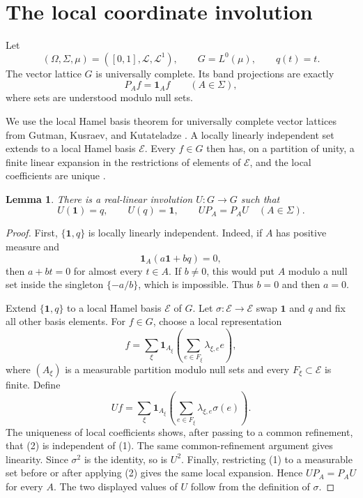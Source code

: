 \documentclass[11pt]{article}
\newtheorem{lemma}[theorem]{Lemma}
\newcommand{\one}{\mathbf 1}
\newcommand{\cE}{\mathcal E}
\newcommand{\cL}{\mathcal L}
\begin{document}
\section{The local coordinate involution}

Let
\[
 (\Omega,\Sigma,\mu)=([0,1],\mathcal L,\cL^1),
 \qquad G=L^0(\mu),\qquad q(t)=t.
\]
The vector lattice $G$ is universally complete.  Its band projections are
exactly
\[
 P_Af=\one_Af\qquad(A\in\Sigma),
\]
where sets are understood modulo null sets.

We use the local Hamel basis theorem for universally complete vector lattices
from Gutman, Kusraev, and Kutateladze
\cite[Sections 1.1--1.2]{GKK}.  A locally linearly independent set extends to
a local Hamel basis $\cE$.  Every $f\in G$ then has, on a partition of unity,
a finite linear expansion in the restrictions of elements of $\cE$, and the
local coefficients are unique
\cite[Sections 1.2.1--1.2.3]{GKK}.

\begin{lemma}\label{lem:involution}
There is a real-linear involution $U:G\to G$ such that
\[
 U(\one)=q,\qquad U(q)=\one,\qquad
 U P_A=P_AU\quad(A\in\Sigma).
\]
\end{lemma}

\begin{proof}
First, $\{\one,q\}$ is locally linearly independent.  Indeed, if
$A$ has positive measure and
\[
 \one_A(a\one+bq)=0,
\]
then $a+bt=0$ for almost every $t\in A$.  If $b\ne0$, this would put $A$
modulo a null set inside the singleton $\{-a/b\}$, which is impossible.
Thus $b=0$ and then $a=0$.

Extend $\{\one,q\}$ to a local Hamel basis $\cE$ of $G$.  Let
$\sigma:\cE\to\cE$ swap $\one$ and $q$ and fix all other basis elements.
For $f\in G$, choose a local representation
\[
 f=\sum_{\xi}\one_{A_\xi}
       \left(\sum_{e\in F_\xi}\lambda_{\xi,e}e\right),
 \tag{1}
\]
where $(A_\xi)$ is a measurable partition modulo null sets and every
$F_\xi\subset\cE$ is finite.  Define
\[
 Uf=\sum_{\xi}\one_{A_\xi}
       \left(\sum_{e\in F_\xi}\lambda_{\xi,e}\sigma(e)\right).
 \tag{2}
\]
The uniqueness of local coefficients shows, after passing to a common
refinement, that (2) is independent of (1).  The same common-refinement
argument gives linearity.  Since $\sigma^2$ is the identity, so is $U^2$.
Finally, restricting (1) to a measurable set before or after applying (2)
gives the same local expansion.  Hence $UP_A=P_AU$ for every $A$.  The two
displayed values of $U$ follow from the definition of $\sigma$.
\end{proof}
\end{document}
